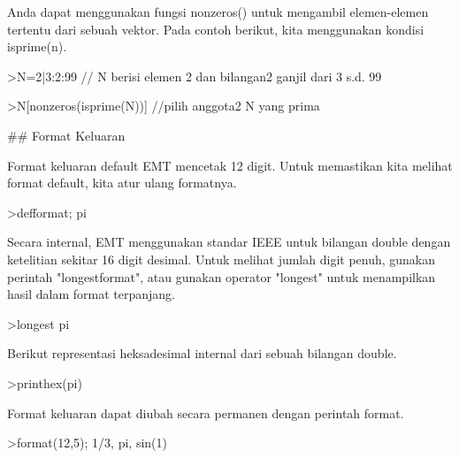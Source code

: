 \documentclass[a4paper,10pt]{article}
\begin{document}
\begin{eulernotebook}
\begin{euleroutput}
  Anda dapat menggunakan fungsi nonzeros() untuk mengambil elemen-elemen tertentu dari sebuah vektor. Pada contoh berikut, kita menggunakan kondisi isprime(n).
  
\end{euleroutput}
\begin{eulerprompt}
>N=2|3:2:99 // N berisi elemen 2 dan bilangan2 ganjil dari 3 s.d. 99
\end{eulerprompt}
\begin{euleroutput}
  
\end{euleroutput}
\begin{eulerprompt}
>N[nonzeros(isprime(N))] //pilih anggota2 N yang prima
\end{eulerprompt}
\begin{euleroutput}
  
  ## Format Keluaran
  
  Format keluaran default EMT mencetak 12 digit. Untuk memastikan kita melihat format default, kita atur ulang formatnya.
  
\end{euleroutput}
\begin{eulerprompt}
>defformat; pi
\end{eulerprompt}
\begin{euleroutput}
  
  Secara internal, EMT menggunakan standar IEEE untuk bilangan double dengan ketelitian sekitar 16 digit desimal. Untuk melihat jumlah digit penuh, gunakan perintah "longestformat", atau gunakan operator "longest" untuk menampilkan hasil dalam format terpanjang.
  
\end{euleroutput}
\begin{eulerprompt}
>longest pi
\end{eulerprompt}
\begin{euleroutput}
  
  Berikut representasi heksadesimal internal dari sebuah bilangan double.
  
\end{euleroutput}
\begin{eulerprompt}
>printhex(pi)
\end{eulerprompt}
\begin{euleroutput}
  
  Format keluaran dapat diubah secara permanen dengan perintah format.
  
\end{euleroutput}
\begin{eulerprompt}
>format(12,5); 1/3, pi, sin(1)
\end{eulerprompt}
\begin{euleroutput}
  

\end{euleroutput}
\end{eulernotebook}
\end{document}
